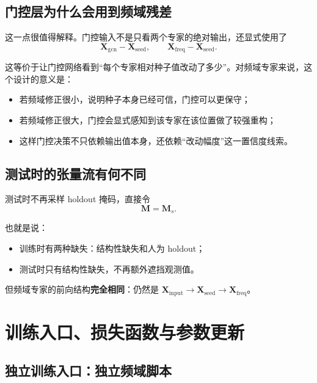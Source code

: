 \documentclass[UTF8]{ctexart}
\begin{document}
\subsection{门控层为什么会用到频域残差}

这一点很值得解释。门控输入不是只看两个专家的绝对输出，还显式使用了
\begin{equation}
    \bm{X}_{\text{gcn}} - \bm{X}_{\text{seed}},
    \qquad
    \bm{X}_{\text{freq}} - \bm{X}_{\text{seed}}.
\end{equation}

这等价于让门控网络看到“每个专家相对种子值改动了多少”。对频域专家来说，这个设计的意义是：
\begin{itemize}
    \item 若频域修正很小，说明种子本身已经可信，门控可以更保守；
    \item 若频域修正很大，门控会显式感知到该专家在该位置做了较强重构；
    \item 这样门控决策不只依赖输出值本身，还依赖“改动幅度”这一置信度线索。
\end{itemize}

\subsection{测试时的张量流有何不同}

测试时不再采样 holdout 掩码，直接令
\begin{equation}
    \bm{M} = \bm{M}_s.
\end{equation}

也就是说：
\begin{itemize}
    \item 训练时有两种缺失：结构性缺失和人为 holdout；
    \item 测试时只有结构性缺失，不再额外遮挡观测值。
\end{itemize}

但频域专家的前向结构\textbf{完全相同}：仍然是
\(\bm{X}_{\text{input}} \rightarrow \bm{X}_{\text{seed}} \rightarrow \bm{X}_{\text{freq}}\)。

\section{训练入口、损失函数与参数更新}

\subsection{独立训练入口：独立频域脚本}
\end{document}
